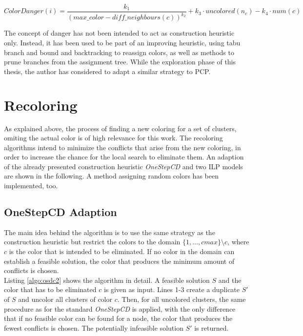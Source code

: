$$ \mathit{ColorDanger}(i) = \frac{k_1}{(\mathit{max\_color} - \mathit{diff\_neighbours}(c))^{k_2}} + k_3 \cdot \mathit{uncolored}(n_c) - k_4 \cdot num(c) $$

The concept of danger has not been intended to act as construction heuristic only. Instead, it has been used to be part of an improving heuristic, using tabu branch and bound and backtracking to reassign colors, as well as methods to prune branches from the assignment tree. While the exploration phase of this thesis, the author has considered to adapt a similar strategy to PCP.

\section{Recoloring}
\label{sec:recoloring}

As explained above, the process of finding a new coloring for a set of clusters, omiting the actual color is of high relevance for this work. The recoloring algorithms intend to minimize the conflicts that arise from the new coloring, in order to increase the chance for the local search to eliminate them. An adaption of the already presented construction heuristic \textit{OneStepCD} and two ILP models are shown in the following. A method assigning random colors has been implemented, too.

\subsection{OneStepCD Adaption}

The main idea behind the algorithm is to use the same strategy as the construction heuristic but restrict the colors to the domain $\{1,\ldots,cmax\}\setminus c$, where $c$ is the color that is intended to be eliminated. If no color in the domain can establish a feasible solution, the color that produces the minimum amount of conflicts is chosen.\\
Listing \ref{algo:osdc2} shows the algorithm in detail. A feasible solution $S$ and the color that has to be eliminated $c$ is given as input. Lines 1-3 create a duplicate $S'$ of $S$ and uncolor all clusters of color $c$. Then, for all uncolored clusters, the same procedure as for the standard \textit{OneStepCD} is applied, with the only difference that if no feasible color can be found for a node, the color that produces the fewest conflicts is chosen. The potentially infeasible solution $S'$ is returned.


